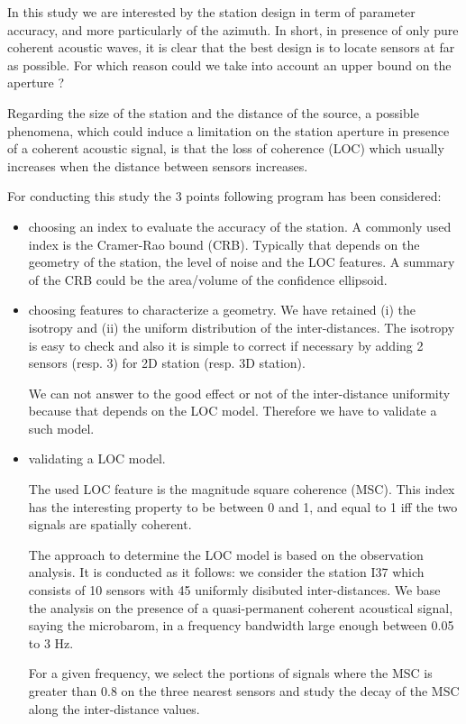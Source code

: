 \documentclass[a4paper, 12pt]{report}
\begin{document}
 \sloppy


In this study we are interested by the station design in term of parameter accuracy, and more particularly of the azimuth. In short, in presence of only pure coherent acoustic waves, it is clear that the best design is to locate sensors at far as possible. For which reason could we take into account an upper bound on the aperture ? 

Regarding the size of the station and the distance of the source, a possible phenomena, which could induce a limitation on the station aperture in presence of a coherent acoustic signal, is that the loss of coherence (LOC) which usually increases when the distance between sensors increases.

For conducting this study the 3 points following program has been considered:
\begin{itemize}
 \item
choosing an index to evaluate the accuracy of the station. A commonly used index is the Cramer-Rao bound (CRB). Typically that depends on the geometry of the station, the level of noise and the LOC features. A summary of the CRB could be the area/volume of the confidence ellipsoid.

 \item
choosing features to characterize a geometry. We have retained (i) the isotropy and (ii) the uniform distribution of the inter-distances. The isotropy is easy to check and also it is simple to correct if necessary by adding 2 sensors (resp. 3) for 2D station (resp. 3D station).

We can not answer to the good effect or not of the inter-distance uniformity because that depends on the LOC model. Therefore we have to validate a such model.

\item
validating a LOC model.

The used LOC feature is the magnitude square coherence (MSC). This index has the interesting property to be between 0 and 1, and equal to 1 iff the two signals are spatially coherent.

	The approach to determine the LOC model is based on the observation analysis. It is conducted as it follows: we consider the station I37 which consists of 10 sensors with 45 uniformly disibuted inter-distances. We base the analysis on the presence of a quasi-permanent coherent acoustical signal, saying the microbarom, in a frequency bandwidth large enough between 0.05 to 3 Hz. 

For a given frequency, we select the portions of signals where the MSC is greater than 0.8 on the three nearest sensors and study the decay of the MSC along the inter-distance values.

\end{itemize}
\end{document}
